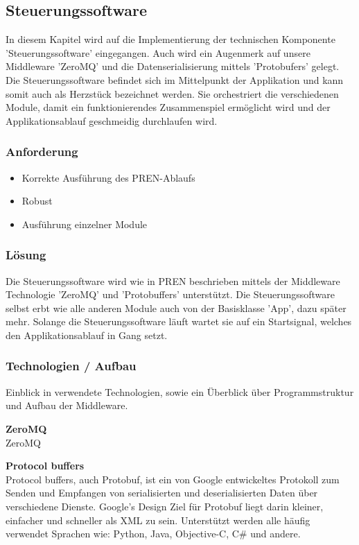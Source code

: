 \documentclass[../../main.tex]{subfiles}
\begin{document}
\subsection{Steuerungssoftware} \label{it_steuerungssoftware}
In diesem Kapitel wird auf die Implementierung der technischen Komponente 'Steuerungssoftware' eingegangen. Auch wird ein Augenmerk auf unsere Middleware 'ZeroMQ' und die Datenserialisierung mittels 'Protobufers' gelegt. Die Steuerungssoftware befindet sich im Mittelpunkt der Applikation und kann somit auch als Herzstück bezeichnet werden. Sie orchestriert die verschiedenen Module, damit ein funktionierendes Zusammenspiel ermöglicht wird und der Applikationsablauf geschmeidig durchlaufen wird.

\subsubsection{Anforderung}

\begin{itemize}
    \item Korrekte Ausführung des PREN-Ablaufs
    \item Robust
    \item Ausführung einzelner Module
\end{itemize}

\subsubsection{Lösung}
Die Steuerungssoftware wird wie in PREN beschrieben mittels der Middleware Technologie 'ZeroMQ' und 'Protobuffers' unterstützt. Die Steuerungssoftware selbst erbt wie alle anderen Module auch von der Basisklasse 'App', dazu später mehr. Solange die Steuerungssoftware läuft wartet sie auf ein Startsignal, welches den Applikationsablauf in Gang setzt.

\subsubsection{Technologien / Aufbau}
Einblick in verwendete Technologien, sowie ein Überblick über Programmstruktur und Aufbau der Middleware.

\textbf{ZeroMQ} \\
ZeroMQ %

\textbf{Protocol buffers} \\
Protocol buffers, auch Protobuf, ist ein von Google entwickeltes Protokoll zum Senden und Empfangen von serialisierten und deserialisierten Daten über verschiedene Dienste. Google's Design Ziel für Protobuf liegt darin kleiner, einfacher und schneller als XML zu sein. Unterstützt werden alle häufig verwendet Sprachen wie: Python, Java, Objective-C, C\# und andere.
\end{document}
